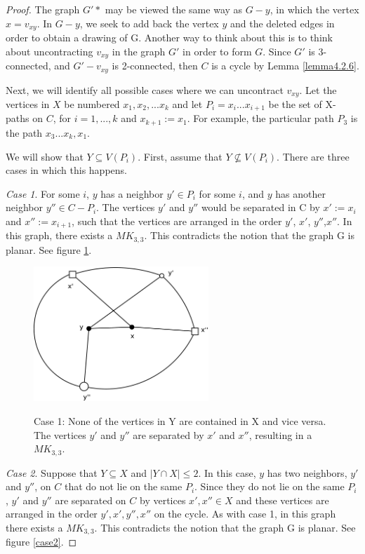 \begin{proof}
The graph $G'*$ may be viewed the same way as $G - y$, in which the vertex $x = v_{xy}$. In $G - y$, we seek to add back the vertex $y$ and the deleted edges in order to obtain a drawing of G. Another way to think about this is to think about uncontracting $v_{xy}$ in the graph $G'$ in order to form $G$.  Since $G'$ is 3-connected, and $G'-v_{xy}$ is 2-connected, then $C$ is a cycle by Lemma \ref{lemma4.2.6}.

Next, we will identify all possible cases where we can uncontract $v_{xy}$. Let the vertices in $X$ be numbered $x_1, x_2, ... x_k$ and let $P_i = x_i ... x_{i+1}$ be the set of X-paths on $C$, for $i = 1,...,k$ and $x_{k+1}:=x_1$. For example, the particular path $P_3$ is the path $x_3 ... x_k, x_1$. 

We will show that $Y\subseteq V(P_i)$. First, assume that $Y\not\subseteq V(P_i)$. There are three cases in which this happens.

\emph{Case 1}. %
For some $i$, $y$ has a neighbor $y' \in P_i$ for some $i$, and $y$ has another neighbor $y'' \in C - P_i$. The vertices $y'$ and $y''$ would be separated in C by $x':=x_i$ and $x'':=x_{i+1}$, such that the vertices are arranged in the order $y'$, $x'$, $y''$,$x''$. In this graph, there exists a $MK_{3,3}$. This contradicts the notion that the graph G is planar. See figure \ref{case1}.

\begin{figure}[htbp]
	\centering
	\includegraphics[height=2in]{case1.eps} \\ 
	\caption{Case 1: None of the vertices in Y are contained in X and vice versa. The vertices $y'$ and $y''$ are separated by $x'$ and $x''$, resulting in a $MK_{3,3}$.}
\label{case1}
\end{figure}

\emph{Case 2}. Suppose that $Y \subseteq X$ and $|Y \cap X| \leq 2$. In this case, $y$ has two neighbors, $y'$ and $y''$, on $C$ that do not lie on the same $P_i$. Since they do not lie on the same $P_i$, $y'$ and $y''$ are separated on $C$ by vertices $x', x'' \in X$ and these vertices are arranged in the order $y', x',y'',x''$ on the cycle. As with case 1, in this graph there exists a $MK_{3,3}$. This contradicts the notion that the graph G is planar. See figure \ref{case2}.


\end{proof}
